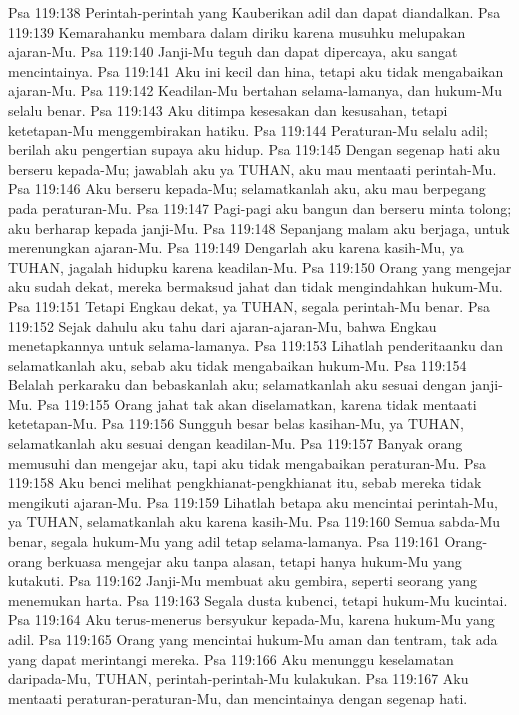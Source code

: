 Psa 119:138  Perintah-perintah yang Kauberikan adil dan dapat diandalkan.
Psa 119:139  Kemarahanku membara dalam diriku karena musuhku melupakan ajaran-Mu.
Psa 119:140  Janji-Mu teguh dan dapat dipercaya, aku sangat mencintainya.
Psa 119:141  Aku ini kecil dan hina, tetapi aku tidak mengabaikan ajaran-Mu.
Psa 119:142  Keadilan-Mu bertahan selama-lamanya, dan hukum-Mu selalu benar.
Psa 119:143  Aku ditimpa kesesakan dan kesusahan, tetapi ketetapan-Mu menggembirakan hatiku.
Psa 119:144  Peraturan-Mu selalu adil; berilah aku pengertian supaya aku hidup.
Psa 119:145  Dengan segenap hati aku berseru kepada-Mu; jawablah aku ya TUHAN, aku mau mentaati perintah-Mu.
Psa 119:146  Aku berseru kepada-Mu; selamatkanlah aku, aku mau berpegang pada peraturan-Mu.
Psa 119:147  Pagi-pagi aku bangun dan berseru minta tolong; aku berharap kepada janji-Mu.
Psa 119:148  Sepanjang malam aku berjaga, untuk merenungkan ajaran-Mu.
Psa 119:149  Dengarlah aku karena kasih-Mu, ya TUHAN, jagalah hidupku karena keadilan-Mu.
Psa 119:150  Orang yang mengejar aku sudah dekat, mereka bermaksud jahat dan tidak mengindahkan hukum-Mu.
Psa 119:151  Tetapi Engkau dekat, ya TUHAN, segala perintah-Mu benar.
Psa 119:152  Sejak dahulu aku tahu dari ajaran-ajaran-Mu, bahwa Engkau menetapkannya untuk selama-lamanya.
Psa 119:153  Lihatlah penderitaanku dan selamatkanlah aku, sebab aku tidak mengabaikan hukum-Mu.
Psa 119:154  Belalah perkaraku dan bebaskanlah aku; selamatkanlah aku sesuai dengan janji-Mu.
Psa 119:155  Orang jahat tak akan diselamatkan, karena tidak mentaati ketetapan-Mu.
Psa 119:156  Sungguh besar belas kasihan-Mu, ya TUHAN, selamatkanlah aku sesuai dengan keadilan-Mu.
Psa 119:157  Banyak orang memusuhi dan mengejar aku, tapi aku tidak mengabaikan peraturan-Mu.
Psa 119:158  Aku benci melihat pengkhianat-pengkhianat itu, sebab mereka tidak mengikuti ajaran-Mu.
Psa 119:159  Lihatlah betapa aku mencintai perintah-Mu, ya TUHAN, selamatkanlah aku karena kasih-Mu.
Psa 119:160  Semua sabda-Mu benar, segala hukum-Mu yang adil tetap selama-lamanya.
Psa 119:161  Orang-orang berkuasa mengejar aku tanpa alasan, tetapi hanya hukum-Mu yang kutakuti.
Psa 119:162  Janji-Mu membuat aku gembira, seperti seorang yang menemukan harta.
Psa 119:163  Segala dusta kubenci, tetapi hukum-Mu kucintai.
Psa 119:164  Aku terus-menerus bersyukur kepada-Mu, karena hukum-Mu yang adil.
Psa 119:165  Orang yang mencintai hukum-Mu aman dan tentram, tak ada yang dapat merintangi mereka.
Psa 119:166  Aku menunggu keselamatan daripada-Mu, TUHAN, perintah-perintah-Mu kulakukan.
Psa 119:167  Aku mentaati peraturan-peraturan-Mu, dan mencintainya dengan segenap hati.

